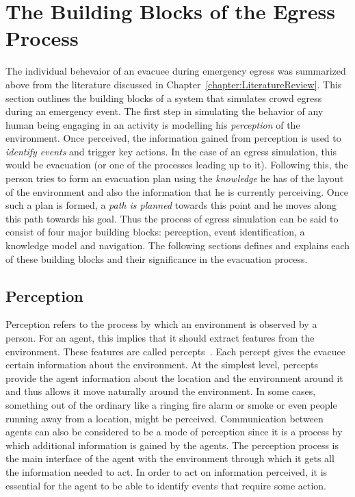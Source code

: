 \section{The Building Blocks of the Egress Process}
\label{IBEVAC:EgressProgress}

The individual behevaior of an evacuee during emergency egress was summarized above from the literature discussed in Chapter~\ref{chapter:LiteratureReview}. This section outlines the building blocks of a system that simulates crowd egress during an emergency event. The first step in simulating the behavior of any human being engaging in an activity is modelling his \emph{perception} of the environment. Once perceived, the information gained from perception is used to \emph{identify events} and trigger key actions. In the case of an egress simulation, this would be evacuation (or one of the processes leading up to it). Following this, the person tries to form an evacuation plan using the \emph{knowledge} he has of the layout of the environment and also the information that he is currently perceiving. Once such a plan is formed, a \emph{path is planned} towards this point and he moves along this path towards his goal. Thus the process of egress simulation can be said to consist of four major building blocks: perception, event identification, a knowledge model and navigation. The following sections defines and explains each of these building blocks and their significance in the evacuation process.

\subsection{Perception}
\label{IBEVAC:IBP}

	Perception refers to the process by which an environment is observed by a person. For an agent, this implies that it should extract features from the environment. These features are called percepts~\cite{Russel:1995vi}. Each percept gives the evacuee certain information about the environment. At the simplest level, percepts provide the agent information about the location and the environment around it and thus allows it move naturally around the environment. In some cases, something out of the ordinary like a ringing fire alarm or smoke or even people running away from a location, might be perceived. Communication between agents can also be considered to be a mode of perception since it is a process by which additional information is gained by the agents. The perception process is the main interface of the agent with the environment through which it gets all the information needed to act. In order to act on information perceived, it is essential for the agent to be able to identify events that require some action.

